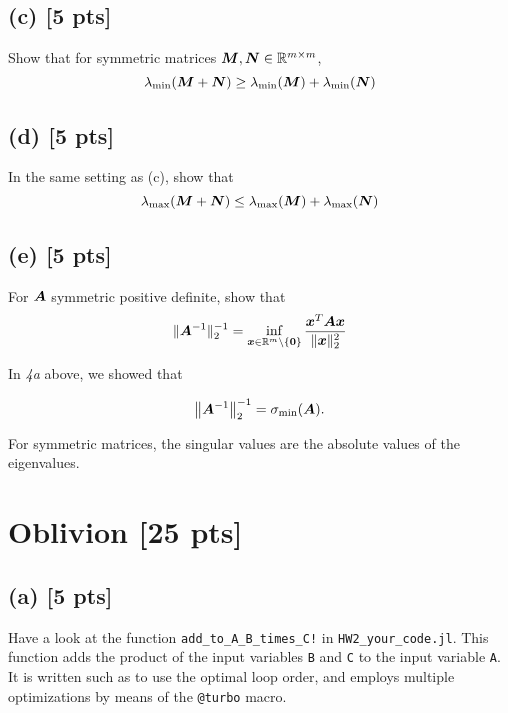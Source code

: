 \documentclass[twoside,10pt]{article}
\begin{document}
{\subsection*{(c) [5 pts]}

Show that for symmetric matrices $\bm{M}, \bm{N} \in \mathbb{R}^{m \times m}$, 
\begin{equation}
  \lambda_{\mathrm{min}}(\mtx{M} + \mtx{N}) \geq \lambda_{\mathrm{min}}\left(\mtx{M}\right) + \lambda_{\mathrm{min}}\left(\mtx{N}\right)
\end{equation}


\subsection*{(d) [5 pts]}
In the same setting as (c), show that 
\begin{equation}
  \lambda_{\mathrm{max}}(\mtx{M} + \mtx{N}) \leq \lambda_{\mathrm{max}}\left(\mtx{M}\right) + \lambda_{\mathrm{max}}\left(\mtx{N}\right)
\end{equation}


\subsection*{(e) [5 pts]}
For $\bm{A}$ symmetric positive definite, show that 
\begin{equation*}
  \|\bm{A}^{-1}\|_{2}^{-1} = \inf \limits_{\bm{x} \in \mathbb{R}^m \setminus \{\bm{0}\}} \frac{\bm{x}^T \bm{A} \bm{x}}{\|\bm{x}\|^2_2}
\end{equation*}

In \textit{4a} above, we showed that 

\begin{equation*}
  \left\|\mtx{A}^{-1}\right\|_2^{-1} = \sigma_{\mathrm{min}}\left(\mtx{A}\right).
\end{equation*}

For symmetric matrices, the singular values are the absolute values of the eigenvalues.

\section{Oblivion [25 pts]}
\subsection*{(a) [5 pts]} 
Have a look at the function \texttt{add\_to\_A\_B\_times\_C!} in \texttt{HW2\_your\_code.jl}. 
This function adds the product of the input variables \texttt{B} and \texttt{C} to the input variable \texttt{A}. 
It is written such as to use the optimal loop order, and employs multiple optimizations by means of the \texttt{@turbo} macro.

}
\end{document}
